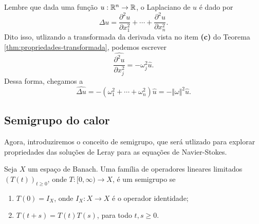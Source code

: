 \begin{ex}
    Lembre que dada uma função $u : \mathbb{R}^n \to \mathbb{R}$, o Laplaciano de $u$ é dado por
    \[
        \Delta u = \frac{\partial^2 u}{\partial x_1^2} + \cdots + \frac{\partial^2 u}{\partial x_n^2}.
    \]
    Dito isso, utlizando a transformada da derivada vista no item \textbf{(c)} do Teorema \ref{thm:propriedades-transformada}, podemos escrever
    \[
        \widehat{\frac{\partial^2 u}{\partial x_j^2}} = -\omega_j^2 \hat u.
    \]
    Dessa forma, chegamos a
    \[
        \widehat{\Delta u} = -(\omega_1^2 + \cdots + \omega_n^2) \hat u = - \Vert \omega \Vert^2 \hat u.
    \]
\end{ex}

\subsection{Semigrupo do calor}

Agora, introduziremos o conceito de semigrupo, que será utlizado para explorar propriedades das soluções de Leray para as equações de Navier-Stokes.

\begin{dbox}
    Seja $X$ um espaço de Banach. Uma família de operadores lineares limitados $(T(t))_{t \geqslant 0}$, onde $T : [0,\infty) \to X$, é um semigrupo se
    \begin{enumerate}
        \item $T(0) = I_X$, onde $I_X : X \to X$ é o operador identidade;
        \item $T(t + s) = T(t)T(s)$,  para todo $t, s \geqslant 0$.
    \end{enumerate}
\end{dbox}

